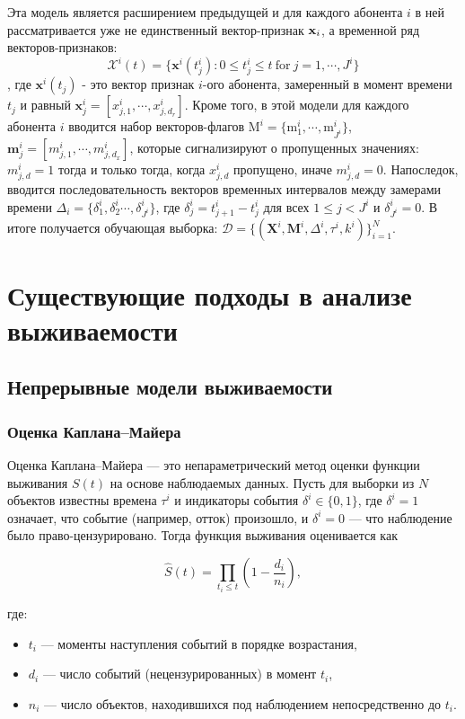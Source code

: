 \documentclass[a4paper,14pt,oneside,openany]{memoir}
\begin{document}
Эта модель является расширением предыдущей и для каждого абонента $i$ в ней рассматривается уже не единственный вектор-признак $\bold{x}_i$, а временной ряд векторов-признаков: 
$$\mathcal{X}^i(t)=\{\mathbf{x}^i(t_j^i):0\leq t_j^i\leq t\mathrm{~for~}j=1,\cdots,J^i\}$$, где $\mathbf{x}^i(t_j)$ - это вектор признак $i$-ого абонента, замеренный в момент времени $t_j$ и равный $\mathbf{x}_j^i=[x_{j,1}^{i},\cdots,x_{j,d_{r}}^{i}]$. Кроме того, в этой модели для каждого абонента $i$ вводится набор векторов-флагов $\mathrm{M}^i=\{\mathrm{m}_1^i,\cdots,\mathrm{m}_{J^i}^i\}$, $\mathbf{m}_j^i=[m_{j,1}^i,\cdots,m_{j,d_x}^i]$, которые сигнализируют о пропущенных значениях: $m_{j,d}^{i}=1$ тогда и только тогда, когда $x_{j,d}^{i}$ пропущено, иначе $m_{j,d}^{i}=0$. Напоследок, вводится последовательность векторов временных интервалов между замерами времени $\Delta_i = \{\delta_{1}^{i},\delta_{2}^{i}\cdots,\delta_{J^{i}}^{i}\}$, где $\delta_{j}^{i}=t_{j+1}^{i}-t_{j}^{i}$ для всех $1\leq j<J^{i}$ и $\delta_{J^i}^i=0$. В итоге получается обучающая выборка: $\mathcal{D}=\{(\mathbf{X}^{i},\mathbf{M}^{i},\Delta^{i},\tau^{i},k^{i})\}_{i=1}^{N}$.

\chapter{Существующие подходы в анализе выживаемости}

\section{Непрерывные модели выживаемости}

\subsection{Оценка Каплана–Майера}

Оценка Каплана–Майера \cite{Kaplan1958} — это непараметрический метод оценки функции выживания $S(t)$ на основе наблюдаемых данных. Пусть для выборки из $N$ объектов известны времена $\tau^i$ и индикаторы события $\delta^i \in \{0,1\}$, где $\delta^i=1$ означает, что событие (например, отток) произошло, и $\delta^i=0$ — что наблюдение было право-цензурировано. Тогда функция выживания оценивается как

\begin{equation}
	\hat{S}(t) = \prod_{t_i \leq t} \left(1 - \frac{d_i}{n_i} \right),
\end{equation}

где:
\begin{itemize}
	\item $t_i$ — моменты наступления событий в порядке возрастания,
	\item $d_i$ — число событий (нецензурированных) в момент $t_i$,
	\item $n_i$ — число объектов, находившихся под наблюдением непосредственно до $t_i$.
\end{itemize}
\end{document}
